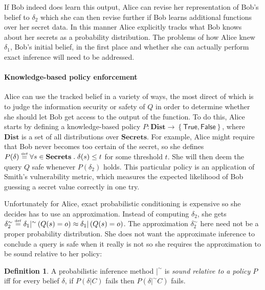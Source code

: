 \documentclass{article} %
\newcommand{\ra}{\rightarrow}
\newcommand{\secrets}[0]{\textbf{Secrets}}
\newcommand{\dists}[0]{\textbf{Dist}}
\newcommand{\sconst}[1]{\ensuremath{\mathsf{#1}}}
\newcommand{\strue}{\sconst{True}}
\newcommand{\sfalse}{\sconst{False}}
\newcommand{\paren}[1]{\left( #1 \right)}
\newcommand{\set}[1]{\left\{ #1 \right\}}
\newcommand{\acond}[0]{|^\sim}
\newcommand{\qsep}[0]{\; . \;}
\newcommand{\stacklabel}[1]{\stackrel{\smash{\scriptscriptstyle \mathrm{#1}}}}
\newcommand{\defeq}{\stacklabel{def}=}
\theoremstyle{plain} %
\theoremstyle{definition} %
\newtheorem*{definition-un}{Definition}
\begin{document}
If Bob indeed does learn this output, Alice can revise her
representation of Bob's belief to $ \delta_2 $ which she can then
revise further if Bob learns additional functions over her secret
data. In this manner Alice explicitly tracks what Bob knows about her
secrets as a probability distribution. The problems of how Alice knew $
\delta_1 $, Bob's initial belief, in the first place and whether she
can actually perform exact inference will need to be addressed.

\paragraph{Knowledge-based policy enforcement}
Alice can use the tracked belief in a variety of ways, the most direct
of which is to judge the information security or safety of $ Q $ in
order to determine whether she should let Bob get access to the output
of the function. To do this, Alice starts by defining a
knowledge-based policy $ P : \dists \ra \set{\strue,\sfalse} $, where
$ \dists $ is a set of all distributions over $ \secrets $. For
example, Alice might require that Bob never becomes too certain of the
secret, so she defines $ P(\delta) \defeq \forall s \in \secrets \qsep
\delta(s) \leq t $ for some threshold $ t $. She will then deem the
query $ Q $ safe whenever $ P(\delta_2) $ holds. This particular
policy is an application of Smith's vulnerability
metric\cite{smith09foundations}, which measures the expected
likelihood of Bob guessing a secret value correctly in one try.

Unfortunately for Alice, exact probabilistic conditioning is expensive
so she decides has to use an approximation. Instead of computing $
\delta_2 $, she gets $ \delta_2^\sim \defeq \delta_1 \acond
\paren{Q(s) = o} \approx \delta_1 | \paren{Q(s) = o} $. The
approximation $ \delta_2^\sim $ here need not be a proper probability
distribution. She does not want the approximate inference to conclude
a query is safe when it really is not so she requires the
approximation to be sound relative to her policy:

\begin{definition-un} A probabilistic inference method $ |^\sim $ is
  \emph{sound relative to a policy $ P $} iff for every belief $
  \delta $, if $ P(\delta | C) $ fails then $ P(\delta |^\sim C) $
  fails.
\end{definition-un}
\end{document}
